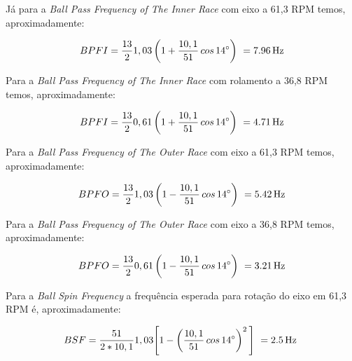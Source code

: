 \documentclass[
	12pt,				
	oneside,			
	a4paper,			
	english,			
	brazil,			
	]{abntex2ppgsi}
\begin{document}

Já para a \textit{Ball Pass Frequency of The Inner Race} com eixo a 61,3 RPM temos, aproximadamente:

\begin{equation}
	BPFI = \frac{13}{2}1,03 \left ( 1 + \frac{10,1}{51} \,cos \, \ang{14} \right )  \ = \SI{7,96}{{\hertz}}
	\label{eq: BPFI no rolamento}
\end{equation}

Para a \textit{Ball Pass Frequency of The Inner Race} com rolamento a 36,8 RPM temos, aproximadamente:

\begin{equation}
	BPFI = \frac{13}{2}0,61 \left ( 1 + \frac{10,1}{51} \,cos \, \ang{14} \right )  \ = \SI{4,71}{{\hertz}}
	\label{eq: BPFI no rolamento}
\end{equation}



Para a \textit{Ball Pass Frequency of The Outer Race} com eixo a 61,3 RPM temos, aproximadamente:

\begin{equation}
	BPFO = \frac{13}{2}1,03 \left ( 1 - \frac{10,1}{51} \,cos \, \ang{14} \right )  \ = \SI{5,42}{{\hertz}}
	\label{eq: BPFO no Rolamento}
\end{equation}

Para a \textit{Ball Pass Frequency of The Outer Race} com eixo a 36,8 RPM temos, aproximadamente:

\begin{equation}
	BPFO = \frac{13}{2}0,61 \left ( 1 - \frac{10,1}{51} \,cos \, \ang{14} \right )  \ = \SI{3,21}{{\hertz}}
	\label{eq: BPFO no Rolamento}
\end{equation}


Para a \textit{Ball Spin Frequency} a frequência esperada para rotação do eixo em 61,3 RPM é, aproximadamente:

\begin{equation}
	BSF = \frac{51}{2*10,1}1,03 \Bigg[  1 - \left ( \frac{10,1}{51} \,cos \, \ang{14} \right ) ^{2}  \Bigg] \ = \SI{2,5}{{\hertz}} \
	\label{eq: BSF no rolamento}
\end{equation}
\end{document}
